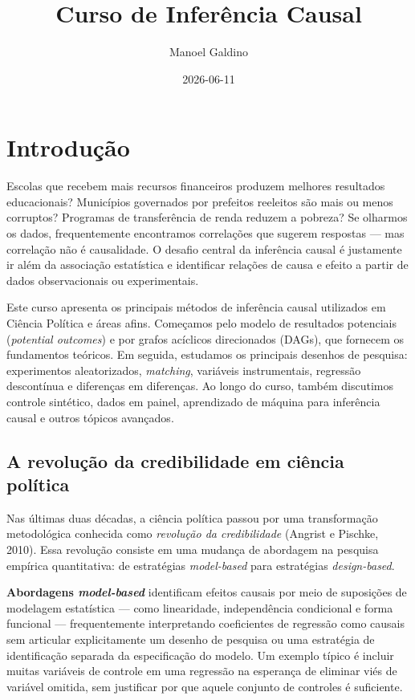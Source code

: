 \documentclass[
]{article}
\title{Curso de Inferência Causal}
\author{Manoel Galdino}
\date{2026-06-11}
\begin{document}
\maketitle

{
\setcounter{tocdepth}{2}
\tableofcontents
}
\section{Introdução}\label{introduuxe7uxe3o}

Escolas que recebem mais recursos financeiros produzem melhores resultados educacionais? Municípios governados por prefeitos reeleitos são mais ou menos corruptos? Programas de transferência de renda reduzem a pobreza? Se olharmos os dados, frequentemente encontramos correlações que sugerem respostas --- mas correlação não é causalidade. O desafio central da inferência causal é justamente ir além da associação estatística e identificar relações de causa e efeito a partir de dados observacionais ou experimentais.

Este curso apresenta os principais métodos de inferência causal utilizados em Ciência Política e áreas afins. Começamos pelo modelo de resultados potenciais (\emph{potential outcomes}) e por grafos acíclicos direcionados (DAGs), que fornecem os fundamentos teóricos. Em seguida, estudamos os principais desenhos de pesquisa: experimentos aleatorizados, \emph{matching}, variáveis instrumentais, regressão descontínua e diferenças em diferenças. Ao longo do curso, também discutimos controle sintético, dados em painel, aprendizado de máquina para inferência causal e outros tópicos avançados.

\subsection{A revolução da credibilidade em ciência política}\label{a-revoluuxe7uxe3o-da-credibilidade-em-ciuxeancia-poluxedtica}

Nas últimas duas décadas, a ciência política passou por uma transformação metodológica conhecida como \emph{revolução da credibilidade} (Angrist e Pischke, 2010). Essa revolução consiste em uma mudança de abordagem na pesquisa empírica quantitativa: de estratégias \emph{model-based} para estratégias \emph{design-based}.

\textbf{Abordagens \emph{model-based}} identificam efeitos causais por meio de suposições de modelagem estatística --- como linearidade, independência condicional e forma funcional --- frequentemente interpretando coeficientes de regressão como causais sem articular explicitamente um desenho de pesquisa ou uma estratégia de identificação separada da especificação do modelo. Um exemplo típico é incluir muitas variáveis de controle em uma regressão na esperança de eliminar viés de variável omitida, sem justificar por que aquele conjunto de controles é suficiente.
\end{document}
